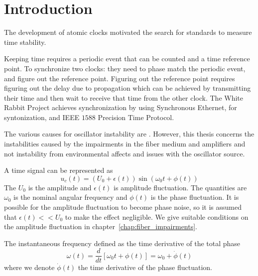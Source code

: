 \label{chap:time_stability}

\section{Introduction}

The development of atomic clocks motivated the search for standards to measure time stability.

Keeping time requires a periodic event that can be counted and a time reference point.  To synchronize two clocks: they need to phase match the periodic event, and figure out the reference point. Figuring out the reference point requires figuring out the delay due to propagation which can be achieved by transmitting their time and then wait to receive that time from the other clock. The White Rabbit Project achieves synchronization by using Synchronous Ethernet, for syntonization, and IEEE $1588$ Precision Time Protocol. 

The various causes for oscillator instability are . However, this thesis concerns the instabilities caused by the impairments in the fiber medium and amplifiers and not instability from environmental affects and issues with the oscillator source.

A time signal can be represented as 
%
\begin{equation}
	u_c(t) = (U_0 + \epsilon(t)) \sin(\omega_0t + \phi(t))
\end{equation}
%
The $U_0$ is the amplitude and $\epsilon(t)$ is amplitude fluctuation. The quantities are $\omega_0$ is the nominal angular frequency and $\phi(t)$ is the phase fluctuation.  It is possible for the amplitude fluctuation to become phase noise, so it is assumed that $\epsilon(t) << U_0$ to make the effect negligible.  We give suitable conditions on the amplitude fluctuation in chapter~\ref{chap:fiber_impairments}.



The instantaneous frequency defined as the time derivative of the total phase
%
\begin{equation}
	\omega(t) = \frac{d}{dt}\left[ \omega_0t + \phi(t)\right] = \omega_0 + \dot{\phi}(t)
\end{equation}
%
where we denote $\dot{\phi}(t)$ the time derivative of the phase fluctuation.